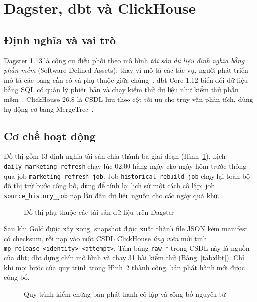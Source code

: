 \section{Dagster, dbt và ClickHouse}
\label{sec:c3-dagster-dbt-clickhouse}

\subsection{Định nghĩa và vai trò}
\label{sec:c3-dagster-dinh-nghia}
Dagster 1.13 là công cụ điều phối theo mô hình \emph{tài sản dữ liệu định nghĩa bằng phần mềm} (Software-Defined Assets): thay vì mô tả các tác vụ, người phát triển mô tả các bảng cần có và phụ thuộc giữa chúng~\cite{dagsterdocs}. dbt Core 1.12 biến đổi dữ liệu bằng SQL có quản lý phiên bản và chạy kiểm thử dữ liệu như kiểm thử phần mềm~\cite{dbtdocs}. ClickHouse 26.8 là CSDL lưu theo cột tối ưu cho truy vấn phân tích, dùng họ động cơ bảng MergeTree~\cite{clickhousedocs}.

\subsection{Cơ chế hoạt động}
\label{sec:c3-dagster-co-che}
Đồ thị gồm 13 định nghĩa tài sản chia thành ba giai đoạn (Hình~\ref{fig:dagster}). Lịch \texttt{daily\_marketing\_refresh} chạy lúc 02:00 hằng ngày cho ngày hôm trước thông qua job \texttt{marketing\_refresh\_job}. Job \texttt{historical\_rebuild\_job} chạy lại toàn bộ đồ thị trừ bước công bố, dùng để tính lại lịch sử một cách cô lập; job \texttt{source\_history\_job} nạp lần đầu dữ liệu nguồn cho các ngày quá khứ.

\begin{figure}[H]
    \centering
    \resizebox{\textwidth}{!}{}
    \caption{Đồ thị phụ thuộc các tài sản dữ liệu trên Dagster}
    \label{fig:dagster}
\end{figure}

Sau khi Gold được xây xong, snapshot được xuất thành file JSON kèm manifest có checksum, rồi nạp vào một CSDL ClickHouse \emph{ứng viên} mới tinh \texttt{mp\_release\_<identity>\_<attempt>}. Tám bảng \texttt{raw\_*} trong CSDL này là nguồn của dbt; dbt dựng chín mô hình và chạy 31 bài kiểm thử (Bảng~\ref{tab:dbt}). Chỉ khi mọi bước của quy trình trong Hình~\ref{fig:certification} thành công, bản phát hành mới được công bố.

\begin{figure}[H]
    \centering
    \resizebox{\textwidth}{!}{}
    \caption{Quy trình kiểm chứng bản phát hành cô lập và công bố nguyên tử}
    \label{fig:certification}
\end{figure}

